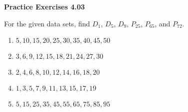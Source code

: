 \vspace{0.3ex}
\noindent\textbf{Practice Exercises 4.03}

\vspace{0.2ex}

For the given data sets, find \(D_1\), \(D_5\), \(D_{9}\), \(P_{25}\), \(P_{65}\), and \(P_{72}\).  

\begin{enumerate}
    \item \(5, 10, 15, 20, 25, 30, 35, 40, 45, 50\)  
    \item \(3, 6, 9, 12, 15, 18, 21, 24, 27, 30\)  
    \item \(2, 4, 6, 8, 10, 12, 14, 16, 18, 20\)  
    \item \(1, 3, 5, 7, 9, 11, 13, 15, 17, 19\)  
    \item \(5, 15, 25, 35, 45, 55, 65, 75, 85, 95\)  
\end{enumerate}
